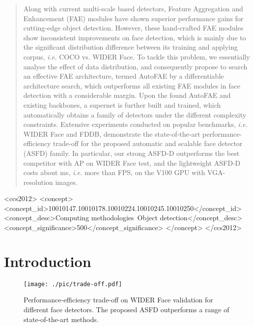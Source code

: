 \documentclass[sigconf]{acmart}
\begin{document}
\begin{abstract}
Along with current multi-scale based detectors, Feature Aggregation and Enhancement (FAE) modules have shown superior performance gains for cutting-edge object detection. However, these hand-crafted FAE modules show inconsistent improvements on face detection, which is mainly due to the significant distribution difference between its training and applying corpus, \textit{i.e.} COCO vs. WIDER Face.
To tackle this problem, we essentially analyse the effect of data distribution, and consequently propose to search an effective FAE architecture, termed AutoFAE by a differentiable architecture search, which outperforms all existing FAE modules in face detection with a considerable margin.
Upon the found AutoFAE and existing backbones, a supernet is further built and trained, which automatically obtains a family of detectors under the different complexity constraints.
Extensive experiments conducted on popular benchmarks, \textit{i.e.} WIDER Face and FDDB, demonstrate the state-of-the-art performance-efficiency trade-off for the proposed automatic and scalable face detector (ASFD) family. In particular, our strong ASFD-D outperforms the best competitor with AP  on WIDER Face test, and the lightweight ASFD-D costs about  ms, \textit{i.e.} more than  FPS, on the V100 GPU with VGA-resolution images.
\end{abstract}



\begin{CCSXML}
<ccs2012>
<concept>
<concept_id>10010147.10010178.10010224.10010245.10010250</concept_id>
<concept_desc>Computing methodologies~Object detection</concept_desc>
<concept_significance>500</concept_significance>
</concept>
</ccs2012>
\end{CCSXML}





\maketitle

\section{Introduction}

\begin{figure}
    \centering
    \texttt{[image: ./pic/trade-off.pdf]}
    \caption{Performance-efficiency trade-off on WIDER Face validation for different face detectors. The proposed ASFD outperforms a range of state-of-the-art methods.}
    \label{fig:trade_off}
\end{figure}
\end{document}
